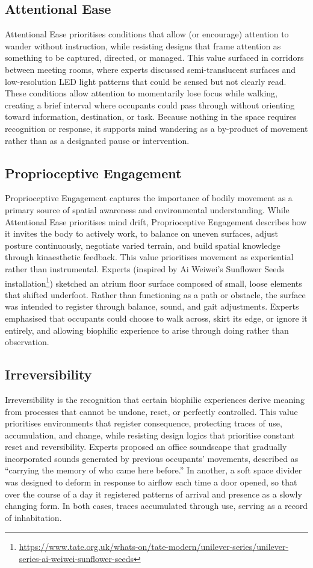 \subsection{Attentional Ease}
Attentional Ease prioritises conditions that allow (or encourage) attention to wander without instruction, while resisting designs that frame attention as something to be captured, directed, or managed. This value surfaced in corridors between meeting rooms, where experts discussed semi-translucent surfaces and low-resolution LED light patterns that could be sensed but not clearly read. These conditions allow attention to momentarily lose focus while walking, creating a brief interval where occupants could pass through without orienting toward information, destination, or task. Because nothing in the space requires recognition or response, it supports mind wandering as a by-product of movement rather than as a designated pause or intervention.

\subsection{Proprioceptive Engagement}
Proprioceptive Engagement captures the importance of bodily movement as a primary source of spatial awareness and environmental understanding. While Attentional Ease prioritises mind drift, Proprioceptive Engagement describes how it invites the body to actively work, to balance on uneven surfaces, adjust posture continuously, negotiate varied terrain, and build spatial knowledge through kinaesthetic feedback. This value prioritises movement as experiential rather than instrumental. Experts (inspired by Ai Weiwei’s Sunflower Seeds installation\footnote{\url{https://www.tate.org.uk/whats-on/tate-modern/unilever-series/unilever-series-ai-weiwei-sunflower-seeds}}) sketched an atrium floor surface composed of small, loose elements that shifted underfoot. Rather than functioning as a path or obstacle, the surface was intended to register through balance, sound, and gait adjustments. Experts emphasised that occupants could choose to walk across, skirt its edge, or ignore it entirely, and allowing biophilic experience to arise through doing rather than observation.

\subsection{Irreversibility}
Irreversibility is the recognition that certain biophilic experiences derive meaning from processes that cannot be undone, reset, or perfectly controlled. This value prioritises environments that register consequence, protecting traces of use, accumulation, and change, while resisting design logics that prioritise constant reset and reversibility. Experts proposed an office soundscape that gradually incorporated sounds generated by previous occupants’ movements, described as ``carrying the memory of who came here before.'' In another, a soft space divider was designed to deform in response to airflow each time a door opened, so that over the course of a day it registered patterns of arrival and presence as a slowly changing form. In both cases, traces accumulated through use, serving as a record of inhabitation.

